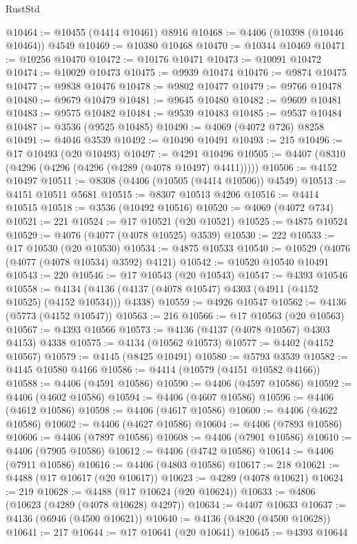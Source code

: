 \begin{lexlean}{RustStd}
\begin{coremodule}
{\begin{coremodule}
{{{{{{{{{{{{{{{{{{{{{{{{{{{{{{{{{{{{{{{{{{{{{{{{{{@10464 := @10455 (@4414 @10461) @8916
@10468 := @4406 (@10398 (@10446 @10464)) @4549
@10469 := @10380 @10468
@10470 := @10344 @10469
@10471 := @10256 @10470
@10472 := @10176 @10471
@10473 := @10091 @10472
@10474 := @10029 @10473
@10475 := @9939 @10474
@10476 := @9874 @10475
@10477 := @9838 @10476
@10478 := @9802 @10477
@10479 := @9766 @10478
@10480 := @9679 @10479
@10481 := @9645 @10480
@10482 := @9609 @10481
@10483 := @9575 @10482
@10484 := @9539 @10483
@10485 := @9537 @10484
@10487 := @3536 (@9525 @10485)
@10490 := @4069 (@4072 @726) @8258
@10491 := @4046 @3539
@10492 := @10490 @10491
@10493 := 215
@10496 := @17 @10493 (@20 @10493)
@10497 := @4291 @10496
@10505 := @4407 (@8310 (@4296 (@4296 (@4296 (@4289 (@4078 @10497) @4411)))))
@10506 := @4152 @10497
@10511 := @8308 (@4406 (@10505 (@4414 @10506)) @4549)
@10513 := @4151 @10511 @5681
@10515 := @8307 @10513 @4206
@10516 := @4414 @10515
@10518 := @3536 (@10492 @10516)
@10520 := @4069 (@4072 @734)
@10521 := 221
@10524 := @17 @10521 (@20 @10521)
@10525 := @4875 @10524
@10529 := @4076 (@4077 (@4078 @10525) @3539)
@10530 := 222
@10533 := @17 @10530 (@20 @10530)
@10534 := @4875 @10533
@10540 := @10529 (@4076 (@4077 (@4078 @10534) @3592) @4121)
@10542 := @10520 @10540 @10491
@10543 := 220
@10546 := @17 @10543 (@20 @10543)
@10547 := @4393 @10546
@10558 := @4134 (@4136 (@4137 (@4078 @10547) @4303 (@4911 (@4152 @10525) (@4152 @10534))) @4338)
@10559 := @4926 @10547
@10562 := @4136 (@5773 (@4152 @10547))
@10563 := 216
@10566 := @17 @10563 (@20 @10563)
@10567 := @4393 @10566
@10573 := @4136 (@4137 (@4078 @10567) @4303 @4153) @4338
@10575 := @4134 (@10562 @10573)
@10577 := @4402 (@4152 @10567)
@10579 := @4145 (@8425 @10491)
@10580 := @5793 @3539
@10582 := @4145 @10580 @4166
@10586 := @4414 (@10579 (@4151 @10582 @4166))
@10588 := @4406 (@4591 @10586)
@10590 := @4406 (@4597 @10586)
@10592 := @4406 (@4602 @10586)
@10594 := @4406 (@4607 @10586)
@10596 := @4406 (@4612 @10586)
@10598 := @4406 (@4617 @10586)
@10600 := @4406 (@4622 @10586)
@10602 := @4406 (@4627 @10586)
@10604 := @4406 (@7893 @10586)
@10606 := @4406 (@7897 @10586)
@10608 := @4406 (@7901 @10586)
@10610 := @4406 (@7905 @10586)
@10612 := @4406 (@4742 @10586)
@10614 := @4406 (@7911 @10586)
@10616 := @4406 (@4803 @10586)
@10617 := 218
@10621 := @4488 (@17 @10617 (@20 @10617))
@10623 := @4289 (@4078 @10621)
@10624 := 219
@10628 := @4488 (@17 @10624 (@20 @10624))
@10633 := @4806 (@10623 (@4289 (@4078 @10628) @4297))
@10634 := @4407 @10633
@10637 := @4136 (@6946 (@4500 @10621))
@10640 := @4136 (@4820 (@4500 @10628))
@10641 := 217
@10644 := @17 @10641 (@20 @10641)
@10645 := @4393 @10644
}}}}}}}}}}}}}}}}}}}}}}}}}}}}}}}}}}}}}}}}}}}}}}}}}}
\end{coremodule}}
\end{coremodule}
\end{lexlean}

